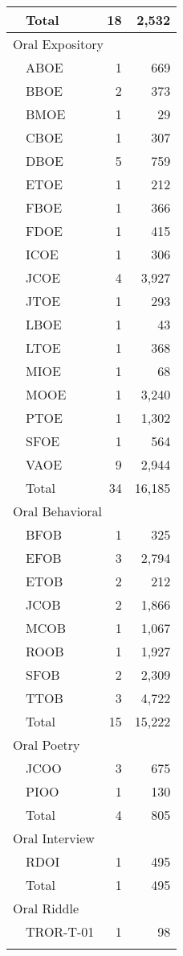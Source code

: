 \begin{longtable}{llrr}
		& Total &  18 & 2,532\\\midrule
		\multicolumn{4}{l}{Oral Expository} \\
		& ABOE & 1 & 669\\
		& BBOE & 2 & 373\\
		& BMOE & 1 & 29\\
		& CBOE & 1 & 307\\
		& DBOE & 5 & 759\\
		& ETOE & 1 & 212\\
		& FBOE & 1 & 366\\
		& FDOE & 1 & 415\\
		& ICOE & 1 & 306\\
		& JCOE & 4 & 3,927\\
		& JTOE & 1 & 293\\
		& LBOE & 1 & 43\\
		& LTOE & 1 & 368\\
		& MIOE & 1 & 68\\
		& MOOE & 1 & 3,240\\
		& PTOE & 1 & 1,302\\
		& SFOE & 1 & 564\\
		& VAOE & 9 & 2,944\\\addlinespace
		& Total &  34 & 16,185\\\midrule
		\multicolumn{4}{l}{Oral Behavioral}\\
		& BFOB & 1 & 325\\
		& EFOB & 3 & 2,794\\
		& ETOB & 2 & 212\\
		& JCOB & 2 & 1,866\\
		& MCOB & 1 & 1,067\\
		& ROOB & 1 & 1,927\\
		& SFOB & 2 & 2,309\\
		& TTOB & 3 & 4,722\\\addlinespace
		& Total &  15 & 15,222\\\midrule
		\multicolumn{4}{l}{Oral Poetry}\\
		& JCOO & 3 & 675\\
		& PIOO & 1 & 130\\\addlinespace
		& Total &  4 &  805\\\midrule
		\multicolumn{4}{l}{Oral Interview}\\
		& RDOI & 1 & 495\\\addlinespace
		& Total &  1 &  495\\\midrule
		\multicolumn{4}{l}{Oral Riddle}\\
		& TROR-T-01 & 1 & 98\\\addlinespace

\end{longtable}
